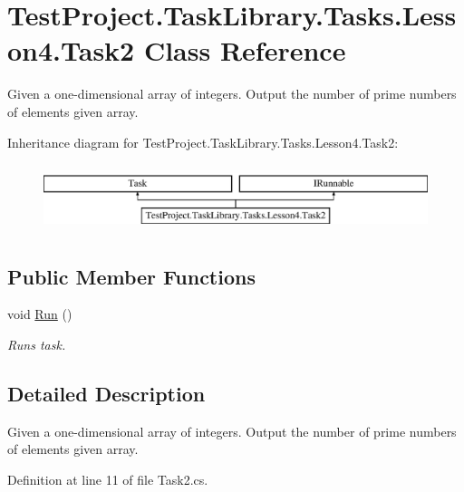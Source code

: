 \hypertarget{class_test_project_1_1_task_library_1_1_tasks_1_1_lesson4_1_1_task2}{}\section{Test\+Project.\+Task\+Library.\+Tasks.\+Lesson4.\+Task2 Class Reference}
\label{class_test_project_1_1_task_library_1_1_tasks_1_1_lesson4_1_1_task2}


Given a one-\/dimensional array of integers. Output the number of prime numbers of elements given array.  


Inheritance diagram for Test\+Project.\+Task\+Library.\+Tasks.\+Lesson4.\+Task2\+:\begin{figure}[H]
\begin{center}
\leavevmode
\includegraphics[height=2.000000cm]{class_test_project_1_1_task_library_1_1_tasks_1_1_lesson4_1_1_task2}
\end{center}
\end{figure}
\subsection*{Public Member Functions}
\begin{DoxyCompactItemize}
\item 
void \mbox{\hyperlink{class_test_project_1_1_task_library_1_1_tasks_1_1_lesson4_1_1_task2_a2689e89b69a1bb0563ad9acd5e2c3bda}{Run}} ()
\begin{DoxyCompactList}\small\item\em Runs task. \end{DoxyCompactList}\end{DoxyCompactItemize}


\subsection{Detailed Description}
Given a one-\/dimensional array of integers. Output the number of prime numbers of elements given array. 



Definition at line 11 of file Task2.\+cs.



